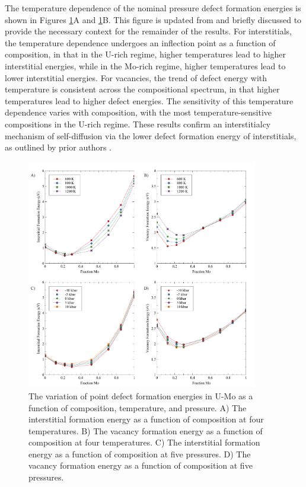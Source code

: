 \documentclass[review]{elsarticle}
\begin{document}
The temperature dependence of the nominal pressure defect formation energies is shown in Figures \ref{fig:A}A and \ref{fig:A}B. This figure is updated from \cite{beelerMRSadv} and briefly discussed to provide the necessary context for the remainder of the results. For interstitials, the temperature dependence undergoes an inflection point as a function of composition, in that in the U-rich regime, higher temperatures lead to higher interstitial energies, while in the Mo-rich regime, higher temperatures lead to lower interstitial energies. For vacancies, the trend of defect energy with temperature is consistent across the compositional spectrum, in that higher temperatures lead to higher defect energies. The sensitivity of this temperature dependence varies with composition, with the most temperature-sensitive compositions in the U-rich regime. These results confirm an interstitialcy mechanism of self-diffusion via the lower defect formation energy of interstitials, as outlined by prior authors \cite{park2021,starikov2018}. 

\begin{figure}[h!]
\centering
\includegraphics[width=0.9\textwidth]{figA.pdf}
\caption{The variation of point defect formation energies in U-Mo as a function of composition, temperature, and pressure. A) The interstitial formation energy as a function of composition at four temperatures. B) The vacancy formation energy as a function of composition at four temperatures. C) The interstitial formation energy as a function of composition at five pressures. D) The vacancy formation energy as a function of composition at five pressures.} 
\label{fig:A}
\end{figure}
\end{document}
